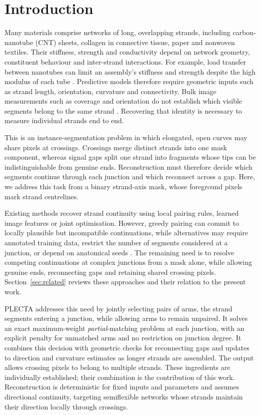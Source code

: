 \section{Introduction}
\label{sec:intro}

Many materials comprise networks of long, overlapping strands, including
carbon-nanotube (CNT) sheets, collagen in connective tissue, paper and nonwoven
textiles. Their stiffness, strength and conductivity depend on network
geometry, constituent behaviour and inter-strand interactions. For example,
load transfer between nanotubes can limit an assembly's stiffness and strength
despite the high modulus of each tube
\citep{devolder2013cnt,coleman2006small,volkov2010structural,%
ostanin2013distinct,ostanin2019size,wittmaack2018mesoscopic}.
Predictive models therefore require geometric inputs such as strand length,
orientation, curvature and connectivity. Bulk image measurements such as
coverage and orientation do not establish which visible segments belong to
the same strand \citep{dong2022detecting,imtiaz2023facile,beigzadeh2024utilizing}.
Recovering that identity is necessary to measure individual strands end to end.

This is an instance-segmentation problem in which elongated, open curves may
share pixels at crossings. Crossings merge distinct strands into one mask
component, whereas signal gaps split one strand into fragments whose tips can
be indistinguishable from genuine ends. Reconstruction must therefore decide
which segments continue through each junction and which reconnect across a
gap. Here, we address this task from a binary strand-axis mask, whose foreground
pixels mark strand centrelines.

Existing methods recover strand continuity using local pairing rules, learned
image features or joint optimisation. However, greedy pairing can commit to
locally plausible but incompatible continuations, while alternatives may
require annotated training data, restrict the number of segments considered
at a junction, or depend on anatomical seeds
\citep{zhang2017sifne,liu2019intersection,playout2026dnai,de2016graph}.
The remaining need is to resolve competing continuations at complex junctions
from a mask alone, while allowing genuine ends, reconnecting gaps and retaining
shared crossing pixels. Section~\ref{sec:related} reviews these approaches and
their relation to the present work.

PLECTA addresses this need by jointly selecting pairs of arms, the strand
segments entering a junction, while allowing arms to remain unpaired. It
solves an exact maximum-weight \emph{partial}-matching problem at each junction,
with an explicit penalty for unmatched arms and no restriction on junction
degree. It combines this decision with geometric checks for reconnecting gaps
and updates to direction and curvature estimates as longer strands are
assembled. The output allows crossing pixels to belong to multiple strands.
These ingredients are individually established; their combination is the
contribution of this work. Reconstruction is deterministic for fixed inputs
and parameters and assumes directional continuity, targeting semiflexible
networks whose strands maintain their direction locally through crossings.

